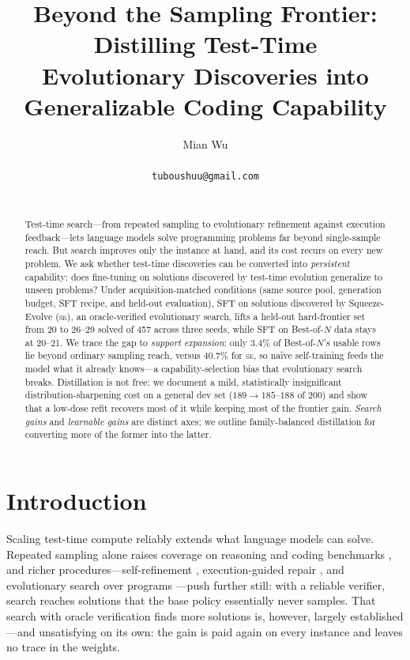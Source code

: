 \documentclass{article}
\title{Beyond the Sampling Frontier: Distilling Test-Time\\ Evolutionary Discoveries into Generalizable Coding Capability}
\author{%
  Mian Wu \\
  \todo{affiliation} \\
  \texttt{tuboushuu@gmail.com} \\
  \And
  \todo{co-authors (Harman, \ldots) and affiliations} \\
}
\newcommand{\se}{\textnormal{\textsc{se}}}
\begin{document}
\maketitle

\begin{abstract}
Test-time search---from repeated sampling to evolutionary refinement against execution feedback---lets language models solve programming problems far beyond single-sample reach. But search improves only the instance at hand, and its cost recurs on every new problem. We ask whether test-time discoveries can be converted into \emph{persistent} capability: does fine-tuning on solutions discovered by test-time evolution generalize to unseen problems? Under acquisition-matched conditions (same source pool, generation budget, SFT recipe, and held-out evaluation), SFT on solutions discovered by Squeeze-Evolve (\se{}), an oracle-verified evolutionary search, lifts a held-out hard-frontier set from 20 to 26--29 solved of 457 across three seeds, while SFT on Best-of-$N$ data stays at 20--21. We trace the gap to \emph{support expansion}: only $3.4\%$ of Best-of-$N$'s usable rows lie beyond ordinary sampling reach, versus $40.7\%$ for \se{}, so na\"ive self-training feeds the model what it already knows---a capability-selection bias that evolutionary search breaks. Distillation is not free: we document a mild, statistically insignificant distribution-sharpening cost on a general dev set ($189 \to 185$--$188$ of $200$) and show that a low-dose refit recovers most of it while keeping most of the frontier gain. \emph{Search gains} and \emph{learnable gains} are distinct axes; we outline family-balanced distillation for converting more of the former into the latter.
\end{abstract}

\section{Introduction}
\label{sec:intro}

Scaling test-time compute reliably extends what language models can solve. Repeated sampling alone raises coverage on reasoning and coding benchmarks \citep{chen2021codex, brown2024monkeys, snell2024scaling}, and richer procedures---self-refinement \citep{madaan2023selfrefine, shinn2023reflexion}, execution-guided repair \citep{olausson2024selfrepair}, and evolutionary search over programs \citep{romera2024funsearch, novikov2025alphaevolve}---push further still: with a reliable verifier, search reaches solutions that the base policy essentially never samples. That search with oracle verification finds more solutions is, however, largely established---and unsatisfying on its own: the gain is paid again on every instance and leaves no trace in the weights.
\end{document}
